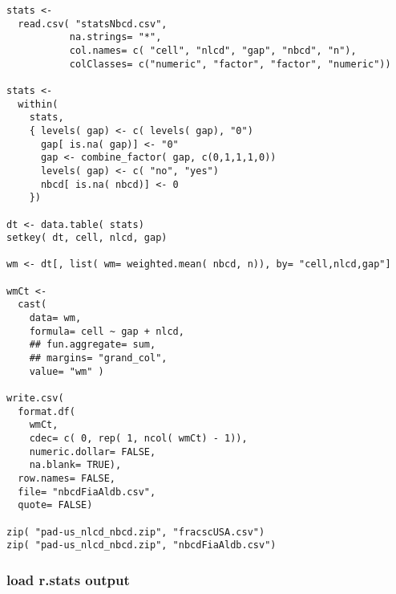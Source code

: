 \documentclass[11pt]{article}
\begin{document}
\begin{verbatim}
stats <-
  read.csv( "statsNbcd.csv",
           na.strings= "*",
           col.names= c( "cell", "nlcd", "gap", "nbcd", "n"),
           colClasses= c("numeric", "factor", "factor", "numeric"))

stats <-
  within(
    stats,
    { levels( gap) <- c( levels( gap), "0")
      gap[ is.na( gap)] <- "0"
      gap <- combine_factor( gap, c(0,1,1,1,0))
      levels( gap) <- c( "no", "yes")
      nbcd[ is.na( nbcd)] <- 0
    })

dt <- data.table( stats)
setkey( dt, cell, nlcd, gap)

wm <- dt[, list( wm= weighted.mean( nbcd, n)), by= "cell,nlcd,gap"]

wmCt <-
  cast(
    data= wm,
    formula= cell ~ gap + nlcd,
    ## fun.aggregate= sum,
    ## margins= "grand_col",
    value= "wm" )

write.csv(
  format.df(
    wmCt,
    cdec= c( 0, rep( 1, ncol( wmCt) - 1)),
    numeric.dollar= FALSE,
    na.blank= TRUE),
  row.names= FALSE,
  file= "nbcdFiaAldb.csv",
  quote= FALSE)

zip( "pad-us_nlcd_nbcd.zip", "fracscUSA.csv")
zip( "pad-us_nlcd_nbcd.zip", "nbcdFiaAldb.csv")
\end{verbatim}
  
\subsubsection{load r.stats output}
\label{sec-3-5-2}
\end{document}
